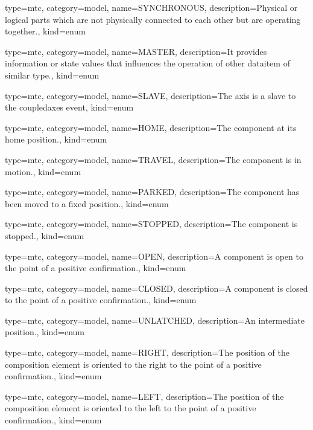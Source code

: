 {
  type=mtc,
  category=model,
  name={SYNCHRONOUS},
  description={Physical or logical parts which are not physically connected to each other but are operating together.},
  kind={enum}
}


{
  type=mtc,
  category=model,
  name={MASTER},
  description={It provides information or state values that influences the operation of other \gls{dataitem} of similar type.},
  kind={enum}
}


{
  type=mtc,
  category=model,
  name={SLAVE},
  description={The axis is a slave to the \gls{coupledaxes event}},
  kind={enum}
}


{
  type=mtc,
  category=model,
  name={HOME},
  description={The component at its home position.},
  kind={enum}
}


{
  type=mtc,
  category=model,
  name={TRAVEL},
  description={The component is in motion.},
  kind={enum}
}


{
  type=mtc,
  category=model,
  name={PARKED},
  description={The component has been moved to a fixed position.},
  kind={enum}
}


{
  type=mtc,
  category=model,
  name={STOPPED},
  description={The component is stopped.},
  kind={enum}
}


{
  type=mtc,
  category=model,
  name={OPEN},
  description={A component is open to the point of a positive confirmation.},
  kind={enum}
}


{
  type=mtc,
  category=model,
  name={CLOSED},
  description={A component is closed to the point of a positive confirmation.},
  kind={enum}
}


{
  type=mtc,
  category=model,
  name={UNLATCHED},
  description={An intermediate position.},
  kind={enum}
}


{
  type=mtc,
  category=model,
  name={RIGHT},
  description={The position of the \gls{composition} element is oriented to the right to the point of a positive confirmation.},
  kind={enum}
}


{
  type=mtc,
  category=model,
  name={LEFT},
  description={The position of the \gls{composition} element is oriented to the left to the point of a positive confirmation.},
  kind={enum}
}


